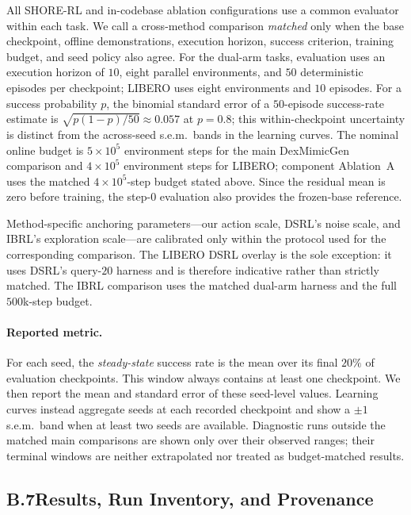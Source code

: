 \documentclass[letterpaper]{article} %
\begin{document}
All SHORE-RL and in-codebase ablation configurations use a common evaluator within each task.
We call a cross-method comparison \emph{matched} only when the base checkpoint,
offline demonstrations, execution horizon, success criterion, training budget, and
seed policy also agree. For the dual-arm tasks, evaluation uses an execution horizon
of $10$, eight parallel environments, and $50$ deterministic episodes per checkpoint;
LIBERO uses eight environments and $10$ episodes. For a success probability $p$, the
binomial standard error of a $50$-episode success-rate estimate is
$\sqrt{p(1-p)/50}\approx0.057$ at $p=0.8$; this within-checkpoint uncertainty is
distinct from the across-seed s.e.m.\ bands in the learning curves. The nominal online budget is
$5{\times}10^{5}$ environment steps for the main DexMimicGen comparison and
$4{\times}10^{5}$ environment steps for LIBERO; component Ablation~A uses the
matched $4{\times}10^{5}$-step budget stated above. Since the residual mean is zero
before training, the step-$0$ evaluation also provides the frozen-base reference.

Method-specific anchoring parameters---our action scale, DSRL's noise scale, and
IBRL's exploration scale---are calibrated only within the protocol used for the
corresponding comparison. The LIBERO DSRL overlay is the sole exception: it uses
DSRL's query-$20$ harness and is therefore indicative rather than strictly matched.
The IBRL comparison uses the matched dual-arm harness and the full $500$k-step
budget.

\paragraph{Reported metric.}
For each seed, the \emph{steady-state} success rate is the mean over its final $20\%$
of evaluation checkpoints. This window always contains at least one checkpoint. We then
report the mean and standard error of these seed-level values. Learning curves instead aggregate seeds at
each recorded checkpoint and show a $\pm1$ s.e.m.\ band when at least two seeds are
available. Diagnostic runs outside the matched main comparisons are shown only
over their observed ranges; their terminal windows are neither extrapolated nor
treated as budget-matched results.

\subsection{B.7\quad Results, Run Inventory, and Provenance}
\end{document}
